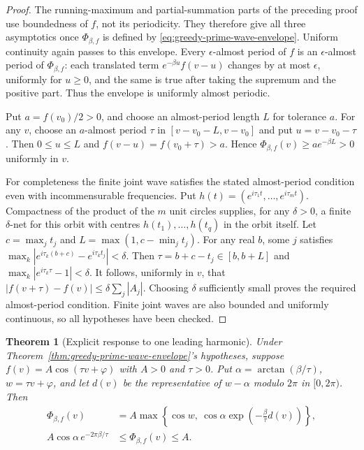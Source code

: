 \documentclass[11pt]{article}
\newtheorem{theorem}{Theorem}[section]
\theoremstyle{definition}
\begin{document}
\begin{proof}
The running-maximum and partial-summation parts of the preceding proof
use boundedness of $f$, not its periodicity.
They therefore give all three asymptotics once
$\Phi_{\beta,f}$ is defined by
\eqref{eq:greedy-prime-wave-envelope}.
Uniform continuity again passes to this envelope.
Every $\epsilon$-almost period of $f$ is an
$\epsilon$-almost period of $\Phi_{\beta,f}$: each translated
term $e^{-\beta u}f(v-u)$ changes by at most $\epsilon$,
uniformly for $u\ge0$, and the same is true after taking
the supremum and the positive part.
Thus the envelope is uniformly almost periodic.

Put $a=f(v_0)/2>0$, and choose an almost-period length $L$
for tolerance $a$.
For any $v$, choose an $a$-almost period $\tau$ in
$[v-v_0-L,v-v_0]$ and put $u=v-v_0-\tau$.
Then $0\le u\le L$ and $f(v-u)=f(v_0+\tau)>a$.
Hence $\Phi_{\beta,f}(v)\ge a e^{-\beta L}>0$ uniformly in $v$.

For completeness the finite joint wave satisfies the stated
almost-period condition even with incommensurable frequencies.
Put $h(t)=(e^{i\tau_1t},\ldots,e^{i\tau_mt})$.
Compactness of the product of the $m$ unit circles supplies, for any
$\delta>0$, a finite $\delta$-net for this orbit with centres
$h(t_1),\ldots,h(t_q)$ in the orbit itself.
Let $c=\max_j t_j$ and $L=\max(1,c-\min_j t_j)$.
For any real $b$, some $j$ satisfies
$\max_k|e^{i\tau_k(b+c)}-e^{i\tau_kt_j}|<\delta$.
Then $\tau=b+c-t_j\in[b,b+L]$ and
$\max_k|e^{i\tau_k\tau}-1|<\delta$.
It follows, uniformly in $v$, that
$|f(v+\tau)-f(v)|\le\delta\sum_j|A_j|$.
Choosing $\delta$ sufficiently small proves the required
almost-period condition. Finite joint waves are also bounded and
uniformly continuous, so all hypotheses have been checked.
\end{proof}

\begin{theorem}[Explicit response to one leading harmonic]
\label{thm:greedy-prime-cosine-envelope}
Under Theorem~\ref{thm:greedy-prime-wave-envelope}'s hypotheses, suppose
$f(v)=A\cos(\tau v+\varphi)$ with $A>0$ and $\tau>0$.
Put $\alpha=\arctan(\beta/\tau)$, $w=\tau v+\varphi$, and let
$d(v)$ be the representative of $w-\alpha$ modulo $2\pi$
in $[0,2\pi)$.
Then
\begin{equation}
 \begin{aligned}
 \Phi_{\beta,f}(v)
   &=A\max\left\{\cos w,\
       \cos\alpha\exp\left(-\frac{\beta}{\tau}d(v)\right)\right\},\\
 A\cos\alpha\,e^{-2\pi\beta/\tau}
   &\le\Phi_{\beta,f}(v)\le A.
 \end{aligned}
 \label{eq:greedy-prime-cosine-envelope}
\end{equation}
\end{theorem}
\end{document}
